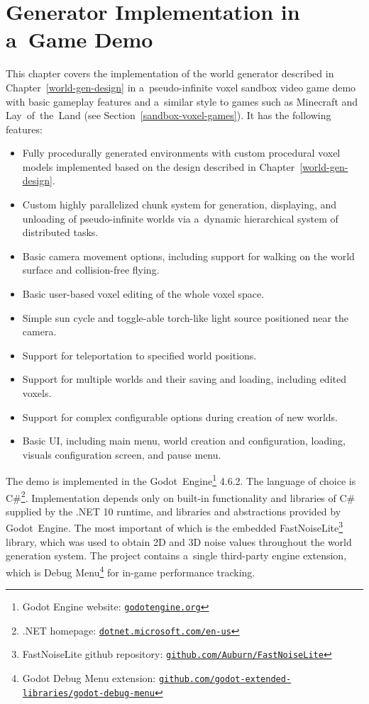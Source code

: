 \chapter{Generator Implementation in a~Game Demo}\label{implementation}
This chapter covers the implementation of the world generator described in Chapter~\ref{world-gen-design} in a~pseudo-infinite voxel sandbox video game demo with basic gameplay features and a~similar style to games such as Minecraft and Lay~of~the~Land (see Section~\ref{sandbox-voxel-games}). It has the following features:

\begin{itemize}
    \item Fully procedurally generated environments with custom procedural voxel models implemented based on the design described in Chapter~\ref{world-gen-design}.
    \item Custom highly parallelized chunk system for generation, displaying, and unloading of pseudo-infinite worlds via a~dynamic hierarchical system of distributed tasks.
    \item Basic camera movement options, including support for walking on the world surface and collision-free flying.
    \item Basic user-based voxel editing of the whole voxel space.
    \item Simple sun cycle and toggle-able torch-like light source positioned near the camera.
    \item Support for teleportation to specified world positions.
    \item Support for multiple worlds and their saving and loading, including edited voxels.
    \item Support for complex configurable options during creation of new worlds.
    \item Basic UI, including main menu, world creation and configuration, loading, visuals configuration screen, and pause menu.
\end{itemize}

The demo is implemented in the Godot~Engine\footnote{Godot Engine website: \href{https://godotengine.org/}{\texttt{godotengine.org}}} 4.6.2. The language of choice is C\#\footnote{.NET homepage: \href{https://dotnet.microsoft.com/en-us/}{\texttt{dotnet.microsoft.com/en-us}}}. Implementation depends only on built-in functionality and libraries of C\# supplied by the .NET 10 runtime, and libraries and abstractions provided by Godot~Engine. The most important of which is the embedded FastNoiseLite\footnote{FastNoiseLite github repository: \href{https://github.com/Auburn/FastNoiseLite}{\texttt{github.com/Auburn/FastNoiseLite}}} library, which was used to obtain 2D and 3D noise values throughout the world generation system. The project contains a~single third-party engine extension, which is Debug Menu\footnote{Godot Debug Menu extension: \href{https://github.com/godot-extended-libraries/godot-debug-menu}{\texttt{github.com/godot-extended-libraries/godot-debug-menu}}} for in-game performance tracking.

